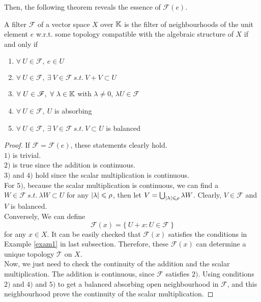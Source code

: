 \documentclass[a4paper,11pt]{report}
\begin{document}
Then, the following theorem reveals the essence of $\mathscr{F}(e)$.
\begin{thm}
	A filter $\mathscr{F}$ of a vector space $X$ over $\mathbb{K}$ is the filter of neighbourhoods of the unit element $e$ w.r.t. some topology compatible with the algebraic structure of $X$ if and only if 
	\begin{enumerate}[label=\arabic*)]
		\item $\forall ~ U \in \mathscr{F},~ e \in U$
		\item $\forall ~ U \in \mathscr{F},~ \exists ~ V \in \mathscr{F} ~s.t.~ V+V \subset U$
		\item $\forall ~ U \in \mathscr{F},~ \forall ~ \lambda \in \mathbb{K}$ with $\lambda \neq 0$, $\lambda U \in \mathscr{F}$
		\item $\forall ~ U \in \mathscr{F},~ U$ is absorbing
		\item $\forall ~ U \in \mathscr{F},~ \exists ~ V \in \mathscr{F} ~s.t.~ V \subset U$ is balanced
	\end{enumerate}
\end{thm}
\begin{proof}
	If $\mathscr{F} = \mathscr{F}(e)$, these statements clearly hold.\\
	$1)$ is trivial.\\
	$2)$ is true since the addition is continuous.\\
	$3)$ and $4)$ hold since the scalar multiplication is continuous.\\
	For $5)$, because the scalar multiplication is continuous, we can find a $W \in \mathscr{F} ~s.t.~ \lambda W \subset U$ for any $\left\lvert\lambda\right\lvert \leqslant \rho$, then let $V = \bigcup_{\left\lvert\lambda\right\lvert \leqslant \rho} \lambda W$. Clearly, $V \in \mathscr{F}$ and $V$ is balanced.\\
	Conversely, We can define
	\begin{equation*}
		\mathscr{F}(x) = \{~ U+x \colon U \in \mathscr{F} ~\}
	\end{equation*}
	for any $x \in X$. It can be easily checked that $\mathscr{F}(x)$ satisfies the conditions in Example \ref{exam1} in last subsection. Therefore, these $\mathscr{F}(x)$ can determine a unique topology $\mathscr{T}$ on $X$.\\
	Now, we just need to check the continuity of the addition and the scalar multiplication. The addition is continuous, since $\mathscr{F}$ satisfies $2)$.  Using conditions $2)$ and $4)$ and $5)$ to get a balanced absorbing open neighbourhood in $\mathscr{F}$, and this neighbourhood prove the continuity of the scalar multiplication.
\end{proof}
\end{document}
